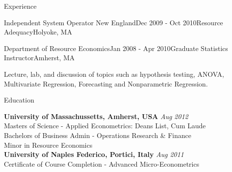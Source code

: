 \documentclass{resume} %
\begin{document}
\begin{rSection}{Experience}
\begin{rSubsection}{Independent System Operator New England}{Dec 2009 - Oct 2010}{Resource Adequacy}{Holyoke, MA}
\end{rSubsection}


\begin{rSubsection}{Department of Resource Economics}{Jan 2008 - Apr 2010}{Graduate Statistics Instructor}{Amherst, MA}
\item Lecture, lab, and discussion of topics such as hypothesis testing, ANOVA, Multivariate Regression, Forecasting and Nonparametric Regression.
\end{rSubsection}

\end{rSection}


\begin{rSection}{Education}

{\bf University of Massachussetts, Amherst, USA} \hfill {\em Aug 2012} \\
Masters of Science -  Applied Econometrics: Deans List, Cum Laude \\
Bachelors of Business Admin - Operations Research \& Finance \\
Minor in Resource Economics \\

{\bf University of Naples Federico, Portici, Italy} \hfill {\em Aug 2011} \\
Certificate of Course Completion - Advanced Micro-Econometrics \\

\end{rSection}

\end{document}
